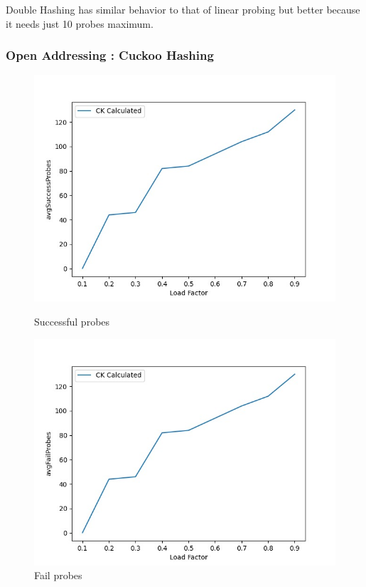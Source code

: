 \documentclass{article}
\begin{document}
      Double Hashing has similar behavior to that of linear probing but better because it needs just 10 probes maximum. 
    
    \subsubsection*{Open Addressing : Cuckoo Hashing}

        \begin{figure}[!h]
          \includegraphics[width=\linewidth]{images/loadFactor_vs_avgSuccessProbes_CK.jpeg}
          \caption{Successful probes}\label{fig:plot10}
        \endminipage\hfill
          \includegraphics[width=\linewidth]{images/loadFactor_vs_avgFailProbes_CK.jpeg}
          \caption{Fail probes}\label{fig:plot11}
        \endminipage
    \end{figure}
    
\end{document}
